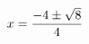 \documentclass[preview]{standalone}
\begin{document}
\begin{align*}
\special{dvisvgm:raw <g id='unique000'>}x=\frac{-4\pm\sqrt{8}}{4}\special{dvisvgm:raw </g>}
\end{align*}
\end{document}
